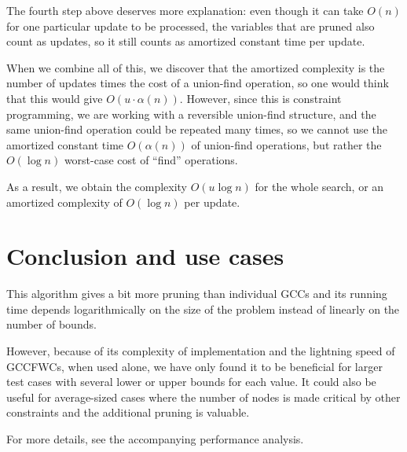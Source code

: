 \documentclass[a4paper,10pt]{article}
\begin{document}
The fourth step above deserves more explanation: even though it can take $O(n)$ for one particular update to be processed, the variables that are pruned also count as updates, so it still counts as amortized constant time per update.

When we combine all of this, we discover that the amortized complexity is the number of updates times the cost of a union-find operation, so one would think that this would give $O(u\cdot\alpha(n))$. However, since this is constraint programming, we are working with a reversible union-find structure, and the same union-find operation could be repeated many times, so we cannot use the amortized constant time $O(\alpha(n))$ of union-find operations, but rather the $O(\log n)$ worst-case cost of ``find'' operations.

As a result, we obtain the complexity $O(u \log n)$ for the whole search, or an amortized complexity of $O(\log n)$ per update.

\section{Conclusion and use cases}

This algorithm gives a bit more pruning than individual GCCs and its running time depends logarithmically on the size of the problem instead of linearly on the number of bounds.

However, because of its complexity of implementation and the lightning speed of GCCFWCs, when used alone, we have only found it to be beneficial for larger test cases with several lower or upper bounds for each value. It could also be useful for average-sized cases where the number of nodes is made critical by other constraints and the additional pruning is valuable.

For more details, see the accompanying performance analysis.
\end{document}
